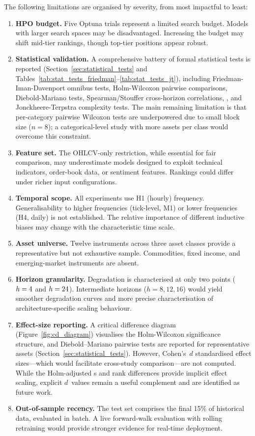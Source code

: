 The following limitations are organised by severity, from most impactful to least:

\begin{enumerate}[label=\textbf{L\arabic*.}]
  \item \textbf{HPO budget.}  Five Optuna trials represent a limited search budget.  Models with larger search spaces may be disadvantaged.  Increasing the budget may shift mid-tier rankings, though top-tier positions appear robust.

  \item \textbf{Statistical validation.}  A comprehensive battery of formal statistical tests is reported (Section~\ref{sec:statistical_tests} and Tables~\ref{tab:stat_tests_friedman}--\ref{tab:stat_tests_jt}), including Friedman-Iman-Davenport omnibus tests, Holm-Wilcoxon pairwise comparisons, Diebold-Mariano tests, Spearman/Stouffer cross-horizon correlations, \icc, and Jonckheere-Terpstra complexity tests.  The main remaining limitation is that per-category pairwise Wilcoxon tests are underpowered due to small block size ($n = 8$); a categorical-level study with more assets per class would overcome this constraint.

  \item \textbf{Feature set.}  The OHLCV-only restriction, while essential for fair comparison, may underestimate models designed to exploit technical indicators, order-book data, or sentiment features.  Rankings could differ under richer input configurations.

  \item \textbf{Temporal scope.}  All experiments use H1 (hourly) frequency.  Generalisability to higher frequencies (tick-level, M1) or lower frequencies (H4, daily) is not established.  The relative importance of different inductive biases may change with the characteristic time scale.

  \item \textbf{Asset universe.}  Twelve instruments across three asset classes provide a representative but not exhaustive sample.  Commodities, fixed income, and emerging-market instruments are absent.

  \item \textbf{Horizon granularity.}  Degradation is characterised at only two points ($h=4$ and $h=24$).  Intermediate horizons ($h = 8, 12, 16$) would yield smoother degradation curves and more precise characterisation of architecture-specific scaling behaviour.

  \item \textbf{Effect-size reporting.}  A critical difference diagram (Figure~\ref{fig:cd_diagram}) visualises the Holm-Wilcoxon significance structure, and Diebold--Mariano pairwise tests are reported for representative assets (Section~\ref{sec:statistical_tests}).  However, Cohen's~$d$ standardised effect sizes---which would facilitate cross-study comparison---are not computed.  While the Holm-adjusted \pvalue{}s and rank differences provide implicit effect scaling, explicit $d$~values remain a useful complement and are identified as future work.

  \item \textbf{Out-of-sample recency.}  The test set comprises the final 15\% of historical data, evaluated in batch.  A live forward-walk evaluation with rolling retraining would provide stronger evidence for real-time deployment.
\end{enumerate}
